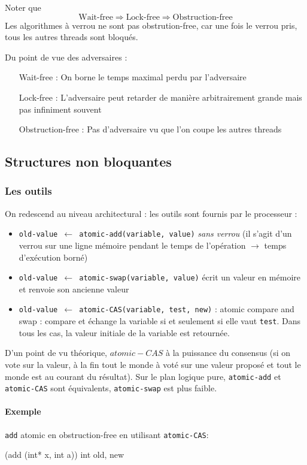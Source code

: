 \documentclass{article}
\begin{document}
Noter que
\[\text{Wait-free} \Rightarrow \text{Lock-free} \Rightarrow \text{Obstruction-free}\]
Les algorithmes à verrou ne sont pas obstrution-free, car une fois le verrou pris, tous les autres threads sont bloqués.
\bigskip

Du point de vue des adversaires :
\begin{itemize}
\item[Wait-free :] On borne le temps maximal perdu par l'adversaire
\item[Lock-free :] L'adversaire peut retarder de manière arbitrairement grande mais pas infiniment souvent
\item[Obstruction-free :] Pas d'adversaire vu que l'on coupe les autres threads
\end{itemize}

\subsection{Structures non bloquantes}
\subsubsection{Les outils}
On redescend au niveau architectural : les outils sont fournis par le processeur :
\begin{itemize}
\item \texttt{old-value $\leftarrow$ atomic-add(variable, value)} \emph{sans verrou} (il s'agit d'un verrou sur une ligne mémoire pendant le temps de l'opération $\to$ temps d'exécution borné)
\item \texttt{old-value $\leftarrow$ atomic-swap(variable, value)} écrit un valeur en mémoire et renvoie son ancienne valeur
\item \texttt{old-value $\leftarrow$ atomic-CAS(variable, test, new)} : atomic compare and swap : compare et échange la variable si et seulement si elle vaut \texttt{test}. Dans tous les cas, la valeur initiale de la variable est retournée.
\end{itemize}

D'un point de vu théorique, $atomic-CAS$ à la puissance du consensus (si on vote sur la valeur, à la fin tout le monde à voté sur une valeur proposé et tout le monde est au courant du résultat). Sur le plan logique pure, \texttt{atomic-add} et \texttt{atomic-CAS} sont équivalents, \texttt{atomic-swap} est plus faible.

\paragraph{Exemple} \texttt{add} atomic en obstruction-free en utilisant \texttt{atomic-CAS}:\\
\begin{algorithm}[H]
\Void({add (int* x, int a)}){
	int old, new\;
}
\end{algorithm}
\bigskip
\end{document}
